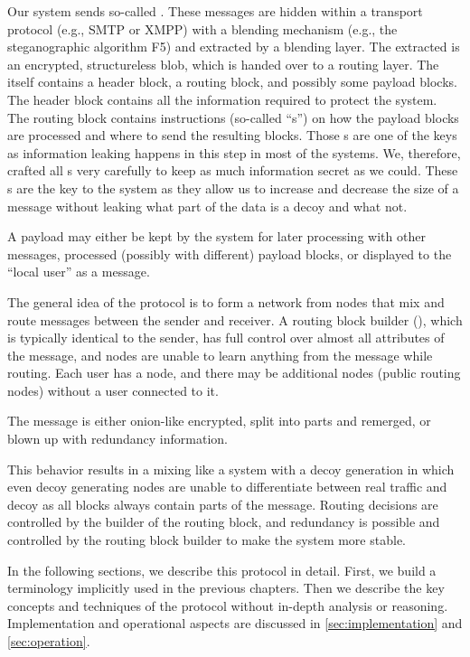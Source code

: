 Our system sends so-called \VortexMessages. These messages are hidden within a transport protocol (e.g., SMTP or XMPP) with a blending mechanism (e.g., the steganographic algorithm F5) and extracted by a blending layer. The extracted \VortexMessage{} is an encrypted, structureless blob, which is handed over to a routing layer. The \VortexMessage{} itself contains a header block, a routing block, and possibly some payload blocks. The header block contains all the information required to protect the system. The routing block contains instructions (so-called ``s'') on how the payload blocks are processed and where to send the resulting blocks. Those s are one of the keys as information leaking happens in this step in most of the systems. We, therefore, crafted all s very carefully to keep as much information secret as we could. These s are the key to the system as they allow us to increase and decrease the size of a message without leaking what part of the data is a decoy and what not.

A payload may either be kept by the system for later processing with other messages, processed (possibly with different) payload blocks, or displayed to the ``local user'' as a message.

The general idea of the protocol is to form a network from nodes that mix and route messages between the sender and receiver. A routing block builder (), which is typically identical to the sender, has full control over almost all attributes of the message, and nodes are unable to learn anything from the message while routing. Each user has a node, and there may be additional nodes (public routing nodes) without a user connected to it. 

The message is either onion-like encrypted, split into parts and remerged, or blown up with redundancy information. 

This behavior results in a mixing like a system with a decoy generation in which even decoy generating nodes are unable to differentiate between real traffic and decoy as all blocks always contain parts of the message. Routing decisions are controlled by the builder of the routing block, and redundancy is possible and controlled by the routing block builder to make the system more stable.

In the following sections, we describe this protocol in detail. First, we build a terminology implicitly used in the previous chapters. Then we describe the key concepts and techniques of the protocol without in-depth analysis or reasoning. Implementation and operational aspects are discussed in \cref{sec:implementation} and \cref{sec:operation}. 


